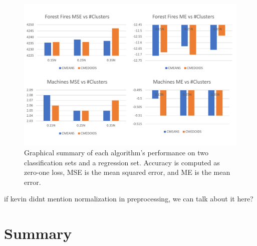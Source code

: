 \documentclass[twoside,11pt]{article}
\begin{document}
\begin{figure}
	\includegraphics[width=\linewidth]{ctuning.pdf}
	\caption{Graphical summary of each algorithm's performance on two classification sets and a regression set. Accuracy is computed as zero-one loss, MSE is the mean squared error, and ME is the mean error.}
	\label{fig:comparealgs}
\end{figure}

if kevin didnt mention normalization in preprocessing, we can talk about it here?

\section{Summary}




\end{document}
